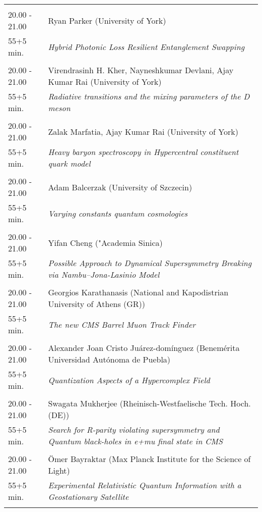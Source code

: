 \begin{longtable}{p{3cm}p{13cm}}
 & \\ 
20.00 - 21.00 & Ryan Parker (University of York)\\ 
55+5 min. & {\it Hybrid Photonic Loss Resilient Entanglement Swapping}\\ 
 & \\ 
20.00 - 21.00 & Virendrasinh H. Kher, Nayneshkumar Devlani, Ajay Kumar Rai (University of York)\\ 
55+5 min. & {\it Radiative transitions and the mixing parameters of the D meson}\\ 
 & \\ 
20.00 - 21.00 & Zalak Marfatia, Ajay Kumar Rai (University of York)\\ 
55+5 min. & {\it Heavy baryon spectroscopy in Hypercentral constituent quark model}\\ 
 & \\ 
20.00 - 21.00 & Adam Balcerzak (University of Szczecin)\\ 
55+5 min. & {\it Varying constants quantum cosmologies}\\ 
 & \\ 
20.00 - 21.00 & Yifan Cheng ("Academia Sinica)\\ 
55+5 min. & {\it Possible Approach to Dynamical Supersymmetry Breaking via Nambu--Jona-Lasinio Model}\\ 
 & \\ 
20.00 - 21.00 & Georgios Karathanasis (National and Kapodistrian University of Athens (GR))\\ 
55+5 min. & {\it The new CMS Barrel Muon Track Finder}\\ 
 & \\ 
20.00 - 21.00 & Alexander Joan Cristo Juárez-domínguez (Benemérita Universidad Autónoma de Puebla)\\ 
55+5 min. & {\it Quantization Aspects of a Hypercomplex Field}\\ 
 & \\ 
20.00 - 21.00 & Swagata Mukherjee (Rheinisch-Westfaelische Tech. Hoch. (DE))\\ 
55+5 min. & {\it Search for R-parity violating supersymmetry and Quantum black-holes in e+mu final state in CMS}\\ 
 & \\ 
20.00 - 21.00 & Ömer Bayraktar (Max Planck Institute for the Science of Light)\\ 
55+5 min. & {\it Experimental Relativistic Quantum Information with a Geostationary Satellite}\\ 
 & \\ 

\end{longtable}
